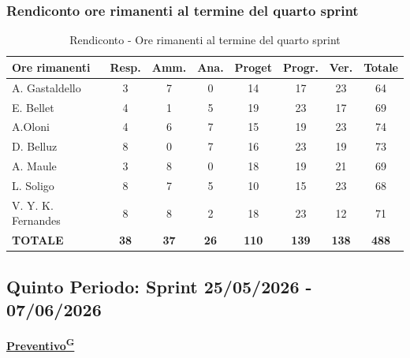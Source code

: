 \documentclass[a4paper,12pt]{article}
\providecommand{\glslink}[2]{\href{https://alittlebyte-19.github.io/Documentazione/glossario.html\#gls-#1}{\underline{#2}\textsuperscript{\scriptsize G}}}
\begin{document}
\subsubsection{Rendiconto ore rimanenti al termine del quarto sprint}

\begin{table}[htbp]
\centering
\renewcommand{\arraystretch}{1.5} 
\begin{tabularx}{\textwidth}{|X|c|c|c|c|c|c|c|}
\hline
\textbf{Ore rimanenti} & \textbf{Resp.} & \textbf{Amm.} & \textbf{Ana.} & \textbf{Proget} & \textbf{Progr.} & \textbf{Ver.} & \textbf{Totale} \\
\hline
A. Gastaldello & 3 & 7 & 0 & 14 & 17 & 23 & 64 \\
\hline
E. Bellet & 4 & 1 & 5 & 19 & 23 & 17 & 69 \\
\hline
A.Oloni & 4 & 6 & 7 & 15 & 19 & 23 & 74 \\
\hline
D. Belluz & 8 & 0 & 7 & 16 & 23 & 19 & 73 \\
\hline
A. Maule & 3 & 8 & 0 & 18 & 19 & 21 & 69 \\
\hline
L. Soligo & 8 & 7 & 5 & 10 & 15 & 23 & 68 \\
\hline
V. Y. K. Fernandes & 8 & 8 & 2 & 18 & 23 & 12 & 71 \\
\hline
\rowcolor{gray!20}
\textbf{TOTALE} & \textbf{38} & \textbf{37} & \textbf{26} & \textbf{110} & \textbf{139} & \textbf{138} & \textbf{488} \\
\hline
\end{tabularx}
\caption{Rendiconto - Ore rimanenti al termine del quarto sprint}
\end{table}

\newpage
\subsection {Quinto Periodo: Sprint 25/05/2026 - 07/06/2026}

\label{sec:pec_quintoperiodo}

\vspace{0.5em}

\begin{center}
\noindent\textbf{\glslink{preventivo}{Preventivo}}
\end{center}
\end{document}
